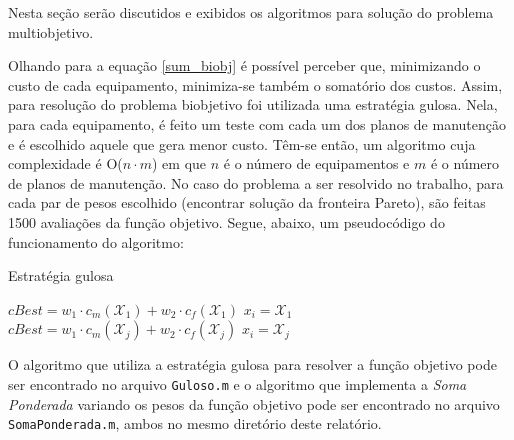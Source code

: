 Nesta seção serão discutidos e exibidos os algoritmos para solução do problema multiobjetivo.

Olhando para a equação \ref{sum_biobj} é possível perceber que, minimizando o custo de cada equipamento, minimiza-se também o somatório dos custos. Assim, para resolução do problema biobjetivo foi utilizada uma estratégia gulosa. Nela, para cada equipamento, é feito um teste com cada um dos planos de manutenção e é escolhido aquele que gera menor custo. Têm-se então, um algoritmo cuja complexidade é O($n\cdot m$) em que $n$ é o número de equipamentos e $m$ é o número de planos de manutenção. No caso do problema a ser resolvido no trabalho, para cada par de pesos escolhido (encontrar solução da fronteira Pareto), são feitas 1500 avaliações da função objetivo. Segue, abaixo, um pseudocódigo do funcionamento do algoritmo:

\begin{algorithm}
	\caption{Estratégia gulosa}
	\begin{algorithmic}[1]
			\State $cBest = w_1 \cdot c_m(\mathcal{X}_1) + w_2 \cdot c_f(\mathcal{X}_1)$
			\State $x_i = \mathcal{X}_1$
					\State $cBest = w_1 \cdot c_m(\mathcal{X}_j) + w_2 \cdot c_f(\mathcal{X}_j)$
					\State $x_i = \mathcal{X}_j$
					\EndIf
			\EndFor
		\EndFor
		
	\end{algorithmic}
\end{algorithm}

O algoritmo que utiliza a estratégia gulosa para resolver a função objetivo pode ser encontrado no arquivo \texttt{Guloso.m} e o algoritmo que implementa a \emph{Soma Ponderada} variando os pesos da função objetivo pode ser encontrado no arquivo \texttt{SomaPonderada.m}, ambos no mesmo diretório deste relatório.